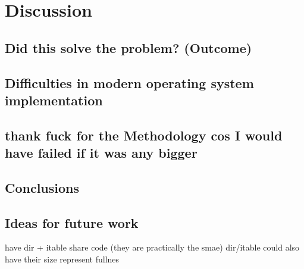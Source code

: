 \chapter{Discussion}

    \section{Did this solve the problem? (Outcome)}

    \section{Difficulties in modern operating system implementation}

    \section{thank fuck for the Methodology cos I would have failed if it was any bigger}

    \section{Conclusions}

    \section{Ideas for future work}

        have dir + itable share code (they are practically the smae)
        dir/itable could also have their size represent fullnes
